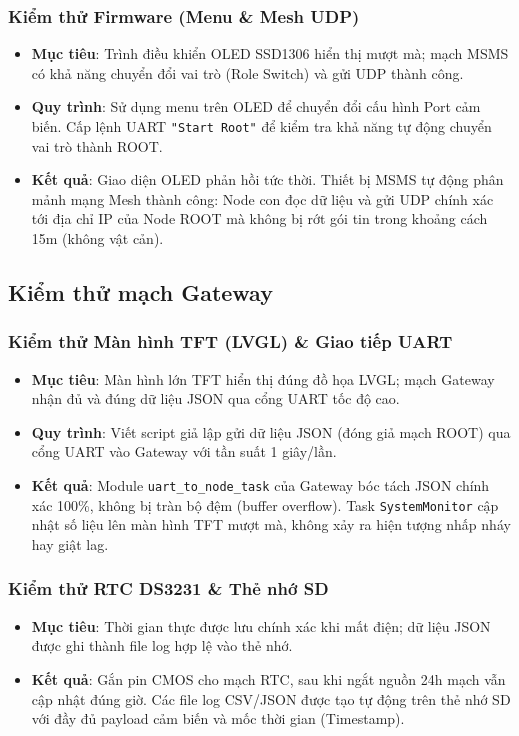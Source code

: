 \documentclass{article} %
\begin{document}
\subsubsection{Kiểm thử Firmware (Menu \& Mesh UDP)}
\begin{itemize}
    \item \textbf{Mục tiêu}: Trình điều khiển OLED SSD1306 hiển thị mượt mà; mạch MSMS có khả năng chuyển đổi vai trò (Role Switch) và gửi UDP thành công.
    \item \textbf{Quy trình}: Sử dụng menu trên OLED để chuyển đổi cấu hình Port cảm biến. Cấp lệnh UART \texttt{"Start Root"} để kiểm tra khả năng tự động chuyển vai trò thành ROOT.
    \item \textbf{Kết quả}: Giao diện OLED phản hồi tức thời. Thiết bị MSMS tự động phân mảnh mạng Mesh thành công: Node con đọc dữ liệu và gửi UDP chính xác tới địa chỉ IP của Node ROOT mà không bị rớt gói tin trong khoảng cách 15m (không vật cản).
\end{itemize}

\subsection{Kiểm thử mạch Gateway}

\subsubsection{Kiểm thử Màn hình TFT (LVGL) \& Giao tiếp UART}
\begin{itemize}
    \item \textbf{Mục tiêu}: Màn hình lớn TFT hiển thị đúng đồ họa LVGL; mạch Gateway nhận đủ và đúng dữ liệu JSON qua cổng UART tốc độ cao.
    \item \textbf{Quy trình}: Viết script giả lập gửi dữ liệu JSON (đóng giả mạch ROOT) qua cổng UART vào Gateway với tần suất 1 giây/lần.
    \item \textbf{Kết quả}: Module \texttt{uart\_to\_node\_task} của Gateway bóc tách JSON chính xác 100\%, không bị tràn bộ đệm (buffer overflow). Task \texttt{SystemMonitor} cập nhật số liệu lên màn hình TFT mượt mà, không xảy ra hiện tượng nhấp nháy hay giật lag.
\end{itemize}

\subsubsection{Kiểm thử RTC DS3231 \& Thẻ nhớ SD}
\begin{itemize}
    \item \textbf{Mục tiêu}: Thời gian thực được lưu chính xác khi mất điện; dữ liệu JSON được ghi thành file log hợp lệ vào thẻ nhớ.
    \item \textbf{Kết quả}: Gắn pin CMOS cho mạch RTC, sau khi ngắt nguồn 24h mạch vẫn cập nhật đúng giờ. Các file log CSV/JSON được tạo tự động trên thẻ nhớ SD với đầy đủ payload cảm biến và mốc thời gian (Timestamp).
\end{itemize}
\end{document}
